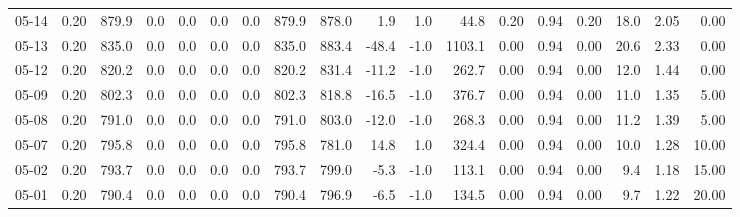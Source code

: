 \begin{threeparttable}
{\begin{tabular}{lrrrrrrrrrrrrrrrrr}
  05-14 &     0.20 & 879.9 &               0.0 &               0.0 &                0.0 &                0.0 & 879.9 & 878.0 &        1.9 &                      1.0 &                44.8 &       0.20 &      0.94 &           0.20 &             18.0 &            2.05 &                   0.00 \\
  05-13 &     0.20 & 835.0 &               0.0 &               0.0 &                0.0 &                0.0 & 835.0 & 883.4 &      -48.4 &                     -1.0 &              1103.1 &       0.00 &      0.94 &           0.00 &             20.6 &            2.33 &                   0.00 \\
  05-12 &     0.20 & 820.2 &               0.0 &               0.0 &                0.0 &                0.0 & 820.2 & 831.4 &      -11.2 &                     -1.0 &               262.7 &       0.00 &      0.94 &           0.00 &             12.0 &            1.44 &                   0.00 \\
  05-09 &     0.20 & 802.3 &               0.0 &               0.0 &                0.0 &                0.0 & 802.3 & 818.8 &      -16.5 &                     -1.0 &               376.7 &       0.00 &      0.94 &           0.00 &             11.0 &            1.35 &                   5.00 \\
  05-08 &     0.20 & 791.0 &               0.0 &               0.0 &                0.0 &                0.0 & 791.0 & 803.0 &      -12.0 &                     -1.0 &               268.3 &       0.00 &      0.94 &           0.00 &             11.2 &            1.39 &                   5.00 \\
  05-07 &     0.20 & 795.8 &               0.0 &               0.0 &                0.0 &                0.0 & 795.8 & 781.0 &       14.8 &                      1.0 &               324.4 &       0.00 &      0.94 &           0.00 &             10.0 &            1.28 &                  10.00 \\
  05-02 &     0.20 & 793.7 &               0.0 &               0.0 &                0.0 &                0.0 & 793.7 & 799.0 &       -5.3 &                     -1.0 &               113.1 &       0.00 &      0.94 &           0.00 &              9.4 &            1.18 &                  15.00 \\
  05-01 &     0.20 & 790.4 &               0.0 &               0.0 &                0.0 &                0.0 & 790.4 & 796.9 &       -6.5 &                     -1.0 &               134.5 &       0.00 &      0.94 &           0.00 &              9.7 &            1.22 &                  20.00 \\

\end{tabular}}
\end{threeparttable}
